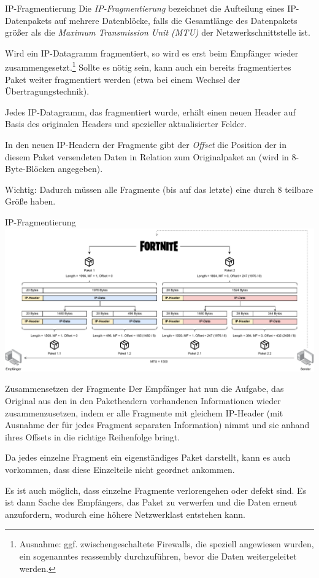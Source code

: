 \begin{defi}{IP-Fragmentierung}
    Die \emph{IP-Fragmentierung} bezeichnet die Aufteilung eines IP-Datenpakets auf mehrere Datenblöcke, falls die Gesamtlänge des Datenpakets größer als die \emph{Maximum Transmission Unit (MTU)} der Netzwerkschnittstelle ist.

    Wird ein IP-Datagramm fragmentiert, so wird es erst beim Empfänger wieder zusammengesetzt.\footnote{Ausnahme: ggf. zwischengeschaltete Firewalls, die speziell angewiesen wurden, ein sogenanntes reassembly durchzuführen, bevor die Daten weitergeleitet werden.}
    Sollte es nötig sein, kann auch ein bereits fragmentiertes Paket weiter fragmentiert werden (etwa bei einem Wechsel der Übertragungstechnik).

    Jedes IP-Datagramm, das fragmentiert wurde, erhält einen neuen Header auf Basis des originalen Headers und spezieller aktualisierter Felder.

    In den neuen IP-Headern der Fragmente gibt der \emph{Offset} die Position der in diesem Paket versendeten Daten in Relation zum Originalpaket an (wird in 8-Byte-Blöcken angegeben).

    Wichtig: Dadurch müssen alle Fragmente (bis auf das letzte) eine durch 8 teilbare Größe haben.
\end{defi}

\begin{example}{IP-Fragmentierung}
    \includegraphics[width=\textwidth]{includes/figures/example_fragmentierung.pdf}
\end{example}

\begin{bonus}{Zusammensetzen der Fragmente}
    Der Empfänger hat nun die Aufgabe, das Original aus den in den Paketheadern vorhandenen Informationen wieder zusammenzusetzen, indem er alle Fragmente mit gleichem IP-Header (mit Ausnahme der für jedes Fragment separaten Information) nimmt und sie anhand ihres Offsets in die richtige Reihenfolge bringt.

    Da jedes einzelne Fragment ein eigenständiges Paket darstellt, kann es auch vorkommen, dass diese Einzelteile nicht geordnet ankommen.

    Es ist auch möglich, dass einzelne Fragmente verlorengehen oder defekt sind.
    Es ist dann Sache des Empfängers, das Paket zu verwerfen und die Daten erneut anzufordern, wodurch eine höhere Netzwerklast entstehen kann.
\end{bonus}

